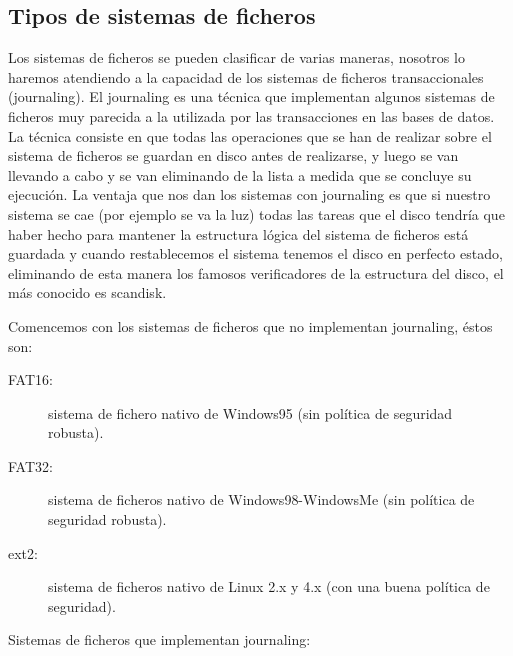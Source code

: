 \subsection{Tipos de sistemas de ficheros}

Los  sistemas de  ficheros  se pueden  clasificar  de varias  maneras,
nosotros  lo haremos  atendiendo a  la  capacidad de  los sistemas  de
ficheros transaccionales  (journaling). El  journaling es  una técnica
que  implementan  algunos  sistemas  de ficheros  muy  parecida  a  la
utilizada  por las  transacciones en  las bases  de datos.  La técnica
consiste en que todas las operaciones  que se han de realizar sobre el
sistema de ficheros  se guardan en disco antes de  realizarse, y luego
se van llevando a cabo y se van eliminando de la lista a medida que se
concluye  su  ejecución. La  ventaja  que  nos  dan los  sistemas  con
journaling es  que si  nuestro sistema  se cae (por  ejemplo se  va la
luz)  todas las  tareas  que el  disco tendría  que  haber hecho  para
mantener la estructura lógica del  sistema de ficheros está guardada y
cuando restablecemos el  sistema tenemos el disco  en perfecto estado,
eliminando de esta  manera los famosos verificadores  de la estructura
del disco, el más conocido es scandisk.

Comencemos con los sistemas de ficheros que no implementan journaling,
éstos son:

\begin{description}

\item[FAT16:] sistema de fichero nativo  de Windows95 (sin política de
seguridad robusta).

\item[FAT32:] sistema de  ficheros nativo de  Windows98-WindowsMe (sin
política de seguridad robusta).

\item[ext2:] sistema de  ficheros nativo de  Linux 2.x y 4.x  (con una
buena política de seguridad).

\end{description}

Sistemas de ficheros que implementan journaling:

